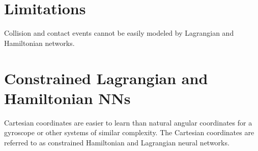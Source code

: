 \documentclass[book.tex]{subfiles}
\begin{document}
\section{Limitations}

Collision and contact events cannot be easily modeled by Lagrangian and Hamiltonian networks.

\section{Constrained Lagrangian and Hamiltonian NNs}

Cartesian coordinates are easier to learn than natural angular coordinates for a gyroscope or other systems of similar complexity. The Cartesian coordinates are referred to as constrained Hamiltonian and Lagrangian neural networks.
\end{document}
